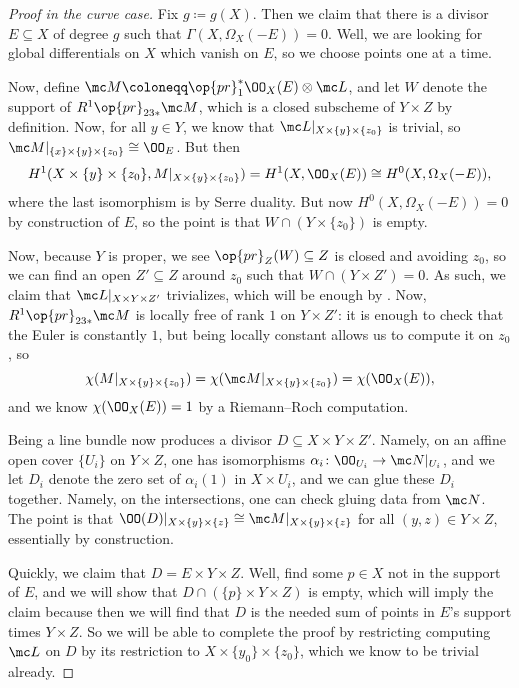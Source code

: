 \documentclass[../notes.tex]{subfiles}
\begin{document}
\begin{proof}[Proof in the curve case]
	Fix $g\coloneqq g(X)$. Then we claim that there is a divisor $E\subseteq X$ of degree $g$ such that $\Gamma(X,\Omega_X(-E))=0$. Well, we are looking for global differentials on $X$ which vanish on $E$, so we choose points one at a time.

	Now, define $\mc M\coloneqq\op{pr}_1^*\OO_X(E)\otimes\mc L$, and let $W$ denote the support of $R^1\op{pr}_{23*}\mc M$, which is a closed subscheme of $Y\times Z$ by definition. Now, for all $y\in Y$, we know that $\mc L|_{X\times\{y\}\times\{z_0\}}$ is trivial, so $\mc M|_{\{x\}\times\{y\}\times\{z_0\}}\cong\OO_E$. But then
	\[H^1(X\times\{y\}\times\{z_0\},M|_{X\times\{y\}\times\{z_0\}})=H^1(X,\OO_X(E))\cong H^0(X,\Omega_X(-E)),\]
	where the last isomorphism is by Serre duality. But now $H^0(X,\Omega_X(-E))=0$ by construction of $E$, so the point is that $W\cap(Y\times\{z_0\})$ is empty.

	Now, because $Y$ is proper, we see $\op{pr}_Z(W)\subseteq Z$ is closed and avoiding $z_0$, so we can find an open $Z'\subseteq Z$ around $z_0$ such that $W\cap(Y\times Z')=0$. As such, we claim that $\mc L|_{X\times Y\times Z'}$ trivializes, which will be enough by . Now, $R^1\op{pr}_{23*}\mc M$ is locally free of rank $1$ on $Y\times Z'$: it is enough to check that the Euler is constantly $1$, but being locally constant allows us to compute it on $z_0$, so
	\[\chi(M|_{X\times\{y\}\times\{z_0\}})=\chi(\mc M|_{X\times\{y\}\times\{z_0\}})=\chi(\OO_X(E)),\]
	and we know $\chi(\OO_X(E))=1$ by a Riemann--Roch computation.

	Being a line bundle now produces a divisor $D\subseteq X\times Y\times Z'$. Namely, on an affine open cover $\{U_i\}$ on $Y\times Z$, one has isomorphisms $\alpha_i\colon\OO_{U_i}\to\mc N|_{U_i}$, and we let $D_i$ denote the zero set of $\alpha_i(1)$ in $X\times U_i$, and we can glue these $D_i$ together. Namely, on the intersections, one can check gluing data from $\mc N$. The point is that $\OO(D)|_{X\times\{y\}\times\{z\}}\cong\mc M|_{X\times\{y\}\times\{z\}}$ for all $(y,z)\in Y\times Z$, essentially by construction.

	Quickly, we claim that $D=E\times Y\times Z$. Well, find some $p\in X$ not in the support of $E$, and we will show that $D\cap(\{p\}\times Y\times Z)$ is empty, which will imply the claim because then we will find that $D$ is the needed sum of points in $E$'s support times $Y\times Z$. So we will be able to complete the proof by restricting computing $\mc L$ on $D$ by its restriction to $X\times\{y_0\}\times\{z_0\}$, which we know to be trivial already.


\end{proof}
\end{document}
